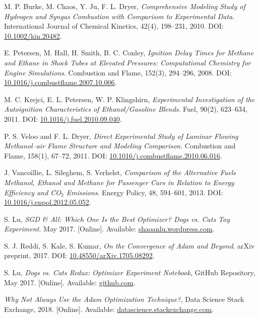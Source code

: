 \documentclass[12pt]{report}
\begin{document}
\begin{thebibliography}{9}
M. P. Burke, M. Chaos, Y. Ju, F. L. Dryer,
\textit{Comprehensive Modeling Study of Hydrogen and Syngas Combustion with Comparison to Experimental Data}. 
International Journal of Chemical Kinetics, 42(4), 198--231, 2010. DOI: \href{https://doi.org/10.1002/kin.20482}{10.1002/kin.20482}.

E. Petersen, M. Hall, H. Smith, B. C. Conley, 
\textit{Ignition Delay Times for Methane and Ethane in Shock Tubes at Elevated Pressures: Computational Chemistry for Engine Simulations}. 
Combustion and Flame, 152(3), 294--296, 2008. DOI: \href{https://doi.org/10.1016/j.combustflame.2007.10.006}{10.1016/j.combustflame.2007.10.006}.

M. C. Krejci, E. L. Petersen, W. P. Klingshirn, 
\textit{Experimental Investigation of the Autoignition Characteristics of Ethanol/Gasoline Blends}. 
Fuel, 90(2), 623--634, 2011. DOI: \href{https://doi.org/10.1016/j.fuel.2010.09.040}{10.1016/j.fuel.2010.09.040}.

P. S. Veloo and F. L. Dryer, 
\textit{Direct Experimental Study of Laminar Flowing Methanol–air Flame Structure and Modeling Comparison}. 
Combustion and Flame, 158(1), 67--72, 2011. DOI: \href{https://doi.org/10.1016/j.combustflame.2010.06.016}{10.1016/j.combustflame.2010.06.016}.

J. Vancoillie, L. Sileghem, S. Verhelst, 
\textit{Comparison of the Alternative Fuels Methanol, Ethanol and Methane for Passenger Cars in Relation to Energy Efficiency and CO$_2$ Emissions}. 
Energy Policy, 48, 594--601, 2013. DOI: \href{https://doi.org/10.1016/j.enpol.2012.05.052}{10.1016/j.enpol.2012.05.052}.

S. Lu, 
\textit{SGD \& All: Which One Is the Best Optimizer? Dogs vs. Cats Toy Experiment}. 
May 2017. [Online]. Available: \href{https://shaoanlu.wordpress.com/2017/05/29/sgd-all-which-one-is-the-best-optimizer-dogs-vs-cats-toy-experiment/}{shaoanlu.wordpress.com}.

S. J. Reddi, S. Kale, S. Kumar,
\textit{On the Convergence of Adam and Beyond}. 
arXiv preprint, 2017. DOI: \href{https://arxiv.org/abs/1705.08292}{10.48550/arXiv.1705.08292}.

S. Lu, 
\textit{Dogs vs. Cats Redux: Optimizer Experiment Notebook}, 
GitHub Repository, May 2017. [Online]. Available: \href{https://github.com/shaoanlu/dogs-vs-cats-redux/blob/master/opt_experiment.ipynb}{github.com}.

\textit{Why Not Always Use the Adam Optimization Technique?}, 
Data Science Stack Exchange, 2018. [Online]. Available: \href{https://datascience.stackexchange.com/questions/30344/why-not-always-use-the-adam-optimization-technique}{datascience.stackexchange.com}.
 

\end{thebibliography}
\end{document}
